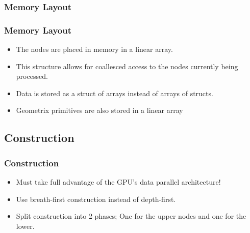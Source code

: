\documentclass{beamer}
\begin{document}
\subsubsection{Memory Layout}
\begin{frame}
  \frametitle{Memory Layout}

  \begin{itemize}
  \item The nodes are placed in memory in a linear array.
    
  \item This structure allows for coallesced access to the nodes currently being
    processed.
  \item Data is stored as a struct of arrays instead of arrays of structs.
  \item Geometrix primitives are also stored in a linear array
  \end{itemize}
\end{frame}

\subsection{Construction}
\begin{frame}
  \frametitle{Construction}
  
  \begin{itemize}
    \item Must take full advantage of the GPU's data parallel architecture!
    \item Use breath-first construction instead of depth-first.
    \item Split construction into 2 phases; One for the upper nodes and one for
      the lower.
  \end{itemize}
\end{frame}
\end{document}
